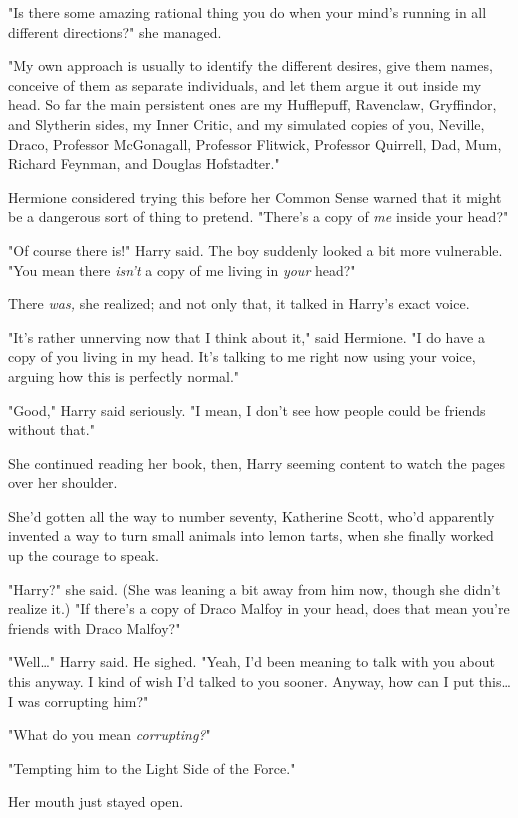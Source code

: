 "Is there some amazing rational thing you do when your mind's running in all 
different directions?" she managed.

"My own approach is usually to identify the different desires, give them names, 
conceive of them as separate individuals, and let them argue it out inside my 
head. So far the main persistent ones are my Hufflepuff, Ravenclaw, Gryffindor, 
and Slytherin sides, my Inner Critic, and my simulated copies of you, Neville, 
Draco, Professor McGonagall, Professor Flitwick, Professor Quirrell, Dad, Mum, 
Richard Feynman, and Douglas Hofstadter."

Hermione considered trying this before her Common Sense warned that it might be 
a dangerous sort of thing to pretend. "There's a copy of \emph{me} inside your 
head?"

"Of course there is!" Harry said. The boy suddenly looked a bit more 
vulnerable. "You mean there \emph{isn't} a copy of me living in \emph{your} 
head?"

There \emph{was,} she realized; and not only that, it talked in Harry's exact 
voice.

"It's rather unnerving now that I think about it," said Hermione. "I do have a 
copy of you living in my head. It's talking to me right now using your voice, 
arguing how this is perfectly normal."

"Good," Harry said seriously. "I mean, I don't see how people could be friends 
without that."

She continued reading her book, then, Harry seeming content to watch the pages 
over her shoulder.

She'd gotten all the way to number seventy, Katherine Scott, who'd apparently 
invented a way to turn small animals into lemon tarts, when she finally worked 
up the courage to speak.

"Harry?" she said. (She was leaning a bit away from him now, though she didn't 
realize it.) "If there's a copy of Draco Malfoy in your head, does that mean 
you're friends with Draco Malfoy?"

"Well{\ldots}" Harry said. He sighed. "Yeah, I'd been meaning to talk with you 
about this anyway. I kind of wish I'd talked to you sooner. Anyway, how can I 
put this{\ldots} I was corrupting him?"

"What do you mean \emph{corrupting?}"

"Tempting him to the Light Side of the Force."

Her mouth just stayed open.

